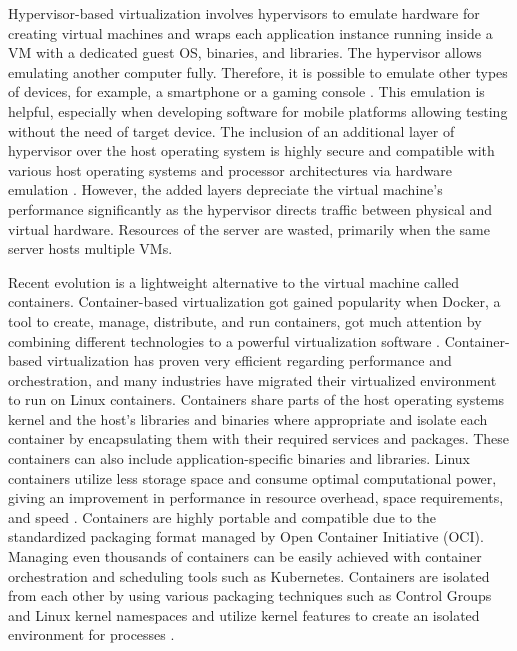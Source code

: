 Hypervisor-based virtualization involves hypervisors to emulate hardware for creating virtual machines and wraps each application instance running inside a VM with a dedicated guest OS, binaries, and libraries. The hypervisor allows emulating another computer fully. Therefore, it is possible to emulate other types of devices, for example, a smartphone or a gaming console \cite{Eder2016}. This emulation is helpful, especially when developing software for mobile platforms allowing testing without the need of target device. The inclusion of an additional layer of hypervisor over the host operating system is highly secure and compatible with various host operating systems and processor architectures via hardware emulation \cite{Lingayat2018}. However, the added layers depreciate the virtual machine's performance significantly as the hypervisor directs traffic between physical and virtual hardware. Resources of the server are wasted, primarily when the same server hosts multiple VMs.

Recent evolution is a lightweight alternative to the virtual machine called containers. Container-based virtualization got gained popularity when Docker, a tool to create, manage, distribute, and run containers, got much attention by combining different technologies to a powerful virtualization software \cite{Eder2016}. Container-based virtualization has proven very efficient regarding performance and orchestration, and many industries have migrated their virtualized environment to run on Linux containers. Containers share parts of the host operating systems kernel and the host's libraries and binaries where appropriate and isolate each container by encapsulating them with their required services and packages.  These containers can also include application-specific binaries and libraries. Linux containers utilize less storage space and consume optimal computational power, giving an improvement in performance in resource overhead, space requirements, and speed \cite{Toimela2017}\cite{Lingayat2018}. Containers are highly portable and compatible due to the standardized packaging format managed by Open Container Initiative (OCI)\cite{OCI}. Managing even thousands of containers can be easily achieved with container orchestration and scheduling tools such as Kubernetes. Containers are isolated from each other by using various packaging techniques such as Control Groups and Linux kernel namespaces and utilize kernel features to create an isolated environment for processes \cite{Flauzac2020}.

